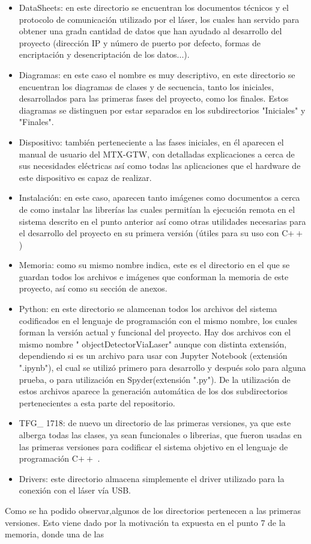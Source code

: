 \begin{itemize}
	\item DataSheets: en este directorio se encuentran los documentos técnicos y el protocolo de comunicación utilizado por el láser, los cuales han servido para obtener una gradn cantidad de datos que han ayudado al desarrollo del proyecto (dirección IP y número de puerto por defecto, formas de encriptación y desencriptación de los datos...).
	\item Diagramas: en este caso el nombre es muy descriptivo, en este directorio se encuentran los diagramas de clases y de secuencia, tanto los iniciales, desarrollados para las primeras fases del proyecto, como los finales. Estos diagramas se distinguen por estar separados en los subdirectorios "Iniciales" y "Finales".
	\item Dispositivo: también perteneciente a las fases iniciales, en él aparecen el manual de usuario del MTX-GTW, con detalladas explicaciones a cerca de sus necesidades eléctricas así como todas las aplicaciones que el hardware de este dispositivo es capaz de realizar.
	\item Instalación: en este caso, aparecen tanto imágenes como documentos a cerca de como instalar las librerías las cuales permitían la ejecución remota en el sistema descrito en el punto anterior así como otras utilidades necesarias para el desarrollo del proyecto en su primera versión (útiles para su uso con C$++$)
	\item Memoria: como su mismo nombre indica, este es el directorio en el que se guardan todos los archivos e imágenes que conforman la memoria de este proyecto, así como su sección de anexos.
	\item Python: en este directorio se alamcenan todos los archivos del sistema codificados en el lenguaje de programación con el mismo nombre, los cuales forman la versión actual y funcional del proyecto. Hay dos archivos con el mismo nombre " objectDetectorViaLaser" aunque con distinta extensión, dependiendo si es un archivo para usar con Jupyter Notebook (extensión ".ipynb"), el cual se utilizó primero para desarrollo y después solo para alguna prueba, o para utilización en Spyder(extensión ".py"). De la utilización de estos archivos aparece la generación automática de los dos subdirectorios pertenecientes a esta parte del repositorio.
	\item TFG\_ 1718: de nuevo un directorio de las primeras versiones, ya que este alberga todas las clases, ya sean funcionales o librerias, que fueron usadas en las primeras versiones para codificar el sistema objetivo en el lenguaje de programación C$++$ .
	\item Drivers: este directorio almacena simplemente el driver utilizado para la conexión con el láser vía USB.
\end{itemize}
Como se ha podido observar,algunos de los directorios pertenecen a las primeras versiones. Esto viene dado por la motivación ta expuesta en el punto 7 de la memoria, donde una de las 
